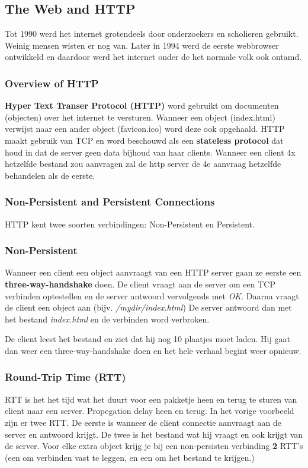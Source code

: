 \subsection{The Web and HTTP}
Tot 1990 werd het internet grotendeels door onderzoekers en scholieren gebruikt. Weinig mensen wisten er nog van. Later in 1994 werd de eerste webbrowser ontwikkeld en daardoor werd het internet onder de het normale volk ook ontamd.


\subsubsection{Overview of HTTP}
\textbf{Hyper Text Transer Protocol (HTTP)} word gebruikt om documenten (objecten) over het internet te versturen. Wanneer een object (index.html) verwijst naar een ander object (favicon.ico) word deze ook opgehaald. HTTP maakt gebruik van TCP en word beschouwd als een \textbf{stateless protocol} dat houd in dat de server geen data bijhoud van haar clients. Wanneer een client 4x hetzelfde bestand zou aanvragen zal de http server de 4e aanvraag hetzelfde behandelen als de eerste.

\subsubsection{Non-Persistent and Persistent Connections}

HTTP kent twee soorten verbindingen: Non-Persistent en Persistent.
\subsubsection*{Non-Persistent}
Wanneer een client een object aanvraagt van een HTTP server gaan ze eerste een \textbf{three-way-handshake} doen. De client vraagt aan de server om een TCP verbinden optestellen en de server antwoord vervolgends met \textit{OK}. Daarna vraagt de client een object aan (bijv. \textit{/mydir/index.html}) De server antwoord dan met het bestand \textit{index.html} en de verbinden word verbroken.
\newline

De client leest het bestand en ziet dat hij nog 10 plaatjes moet laden. Hij gaat dan weer een three-way-handshake doen en het hele verhaal begint weer opnieuw.

\subsubsection*{Round-Trip Time (RTT)}
RTT is het het tijd wat het duurt voor een pakketje heen en terug te sturen van client naar een server. Propegation delay heen en terug.
In het vorige voorbeeld zijn er twee RTT. De eerste is wanneer de client connectie aanvraagt aan de server en antwoord krijgt. De twee is het bestand wat hij vraagt en ook krijgt van de server. Voor elke extra object krijg je bij een non-persisten verbinding \textbf{2} RTT's (een om verbinden vast te leggen, en een om het bestand te krijgen.)

